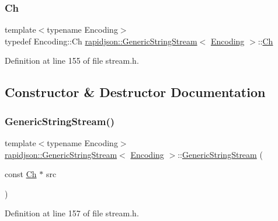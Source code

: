 \subsubsection{\texorpdfstring{Ch}{Ch}}
{\footnotesize\ttfamily template$<$typename Encoding$>$ \\
typedef Encoding\+::\+Ch \mbox{\hyperlink{structrapidjson_1_1_generic_string_stream}{rapidjson\+::\+Generic\+String\+Stream}}$<$ \mbox{\hyperlink{classrapidjson_1_1_encoding}{Encoding}} $>$\+::\mbox{\hyperlink{structrapidjson_1_1_generic_string_stream_a70ad06c96ddf8349be59f3d4f6bbadc8}{Ch}}}



Definition at line 155 of file stream.\+h.



\subsection{Constructor \& Destructor Documentation}
\mbox{\label{structrapidjson_1_1_generic_string_stream_ab160d646f4560d7b95f3fd816c3aac9a}} 
\subsubsection{\texorpdfstring{GenericStringStream()}{GenericStringStream()}}
{\footnotesize\ttfamily template$<$typename Encoding$>$ \\
\mbox{\hyperlink{structrapidjson_1_1_generic_string_stream}{rapidjson\+::\+Generic\+String\+Stream}}$<$ \mbox{\hyperlink{classrapidjson_1_1_encoding}{Encoding}} $>$\+::\mbox{\hyperlink{structrapidjson_1_1_generic_string_stream}{Generic\+String\+Stream}} (\begin{DoxyParamCaption}\item[{const \mbox{\hyperlink{structrapidjson_1_1_generic_string_stream_a70ad06c96ddf8349be59f3d4f6bbadc8}{Ch}} $\ast$}]{src }\end{DoxyParamCaption})}



Definition at line 157 of file stream.\+h.


\begin{DoxyCode}{0}

\end{DoxyCode}


